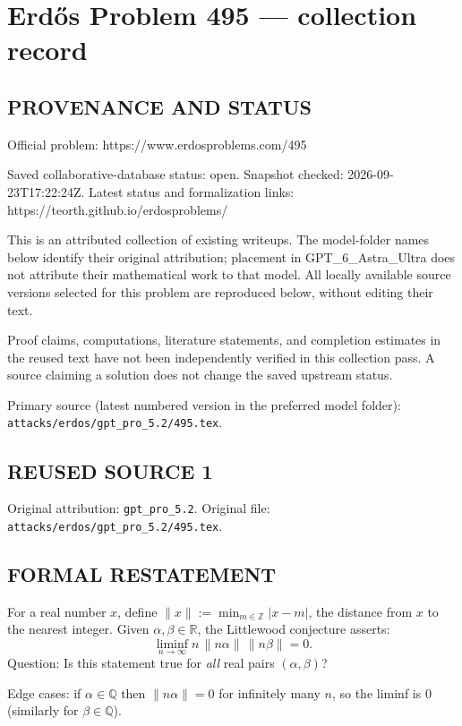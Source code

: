 \section*{Erd\H{o}s Problem 495 --- collection record}

\subsection*{PROVENANCE AND STATUS}
Official problem: https://www.erdosproblems.com/495

Saved collaborative-database status: open.
Snapshot checked: 2026-09-23T17:22:24Z.
Latest status and formalization links: https://teorth.github.io/erdosproblems/

This is an attributed collection of existing writeups. The model-folder names below identify their original attribution; placement in GPT\_6\_Astra\_Ultra does not attribute their mathematical work to that model. All locally available source versions selected for this problem are reproduced below, without editing their text.

Proof claims, computations, literature statements, and completion estimates in the reused text have not been independently verified in this collection pass. A source claiming a solution does not change the saved upstream status.

Primary source (latest numbered version in the preferred model folder): \texttt{attacks/erdos/gpt\_pro\_5.2/495.tex}.

\subsection*{REUSED SOURCE 1}
Original attribution: \texttt{gpt\_pro\_5.2}.
Original file: \texttt{attacks/erdos/gpt\_pro\_5.2/495.tex}.


\subsection*{FORMAL RESTATEMENT}
For a real number $x$, define $\|x\|:=\min_{m\in\mathbb{Z}}|x-m|$, the distance from $x$ to the nearest integer.
Given $\alpha,\beta\in\mathbb{R}$, the Littlewood conjecture asserts:
\[
\liminf_{n\to\infty} n\,\|n\alpha\|\,\|n\beta\| = 0.
\]
Question: Is this statement true for \emph{all} real pairs $(\alpha,\beta)$?

Edge cases: if $\alpha\in\mathbb{Q}$ then $\|n\alpha\|=0$ for infinitely many $n$, so the liminf is $0$ (similarly for $\beta\in\mathbb{Q}$).


